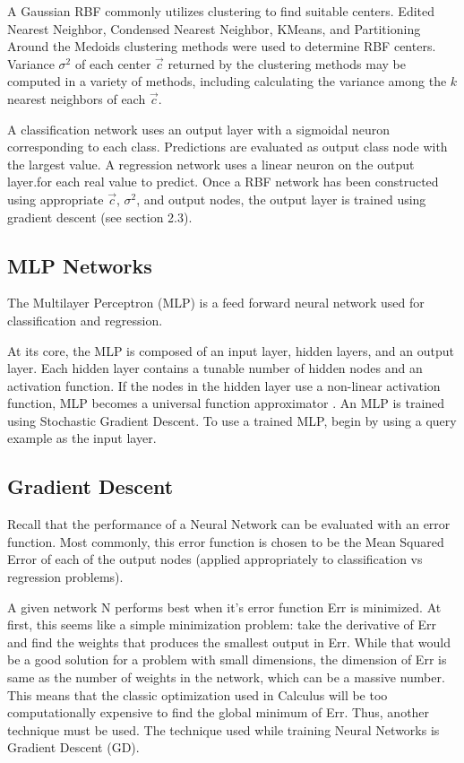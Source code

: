 \documentclass[twoside,11pt]{article}
\begin{document}
	A Gaussian RBF commonly utilizes clustering to find suitable centers. Edited Nearest Neighbor, Condensed Nearest Neighbor, KMeans, and Partitioning Around the Medoids clustering methods were used to determine RBF centers. Variance $\sigma^2$ of each center $\vec c$ returned by the clustering methods may be computed in a variety of methods, including calculating the variance among the $k$ nearest neighbors of each $\vec c$. 
	
	A classification network uses an output layer with a sigmoidal neuron corresponding to each class. Predictions are evaluated as output class node with the largest value. A regression network uses a linear neuron on the output layer.for each real value to predict. Once a RBF network has been constructed using appropriate $\vec c$, $\sigma^2$, and output nodes, the output layer is trained using gradient descent (see section 2.3). 
	

\subsection{MLP Networks}
The Multilayer Perceptron (MLP) is a feed forward neural network used for classification and regression.

At its core, the MLP is composed of an input layer, hidden layers, and an output layer. Each hidden layer contains a tunable number of hidden nodes and an activation function. If the nodes in the hidden layer use a non-linear activation function, MLP becomes a universal function approximator \citep{svozil1997ffnn}.
An MLP is trained using Stochastic Gradient Descent.
To use a trained MLP, begin by using a query example as the input layer. 

\subsection{Gradient Descent}
Recall that the performance of a Neural Network can be evaluated with an error function.
Most commonly, this error function is chosen to be the Mean Squared Error of each of the output nodes (applied appropriately to classification vs regression problems).

A given network N performs best when it's error function Err is minimized.
At first, this seems like a simple minimization problem: take the derivative of Err and find the weights that produces the smallest output in Err.
While that would be a good solution for a problem with small dimensions, the dimension of Err is same as the number of weights in the network, which can be a massive number.
This means that the classic optimization used in Calculus will be too computationally expensive to find the global minimum of Err. Thus, another technique must be used.
The technique used while training Neural Networks is Gradient Descent (GD).
\end{document}
